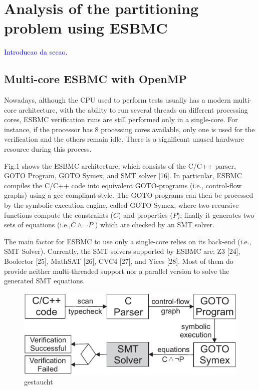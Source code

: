 \section{Analysis of the partitioning problem using ESBMC}

\textcolor{blue}{Introducao da secao.}

\subsection{Multi-core ESBMC with OpenMP}

Nowadays, although the CPU used to perform tests usually has a modern multi-core architecture, with the ability to run several threads on different processing cores, ESBMC verification runs are still performed only in a single-core. For instance, if the processor has 8 processing cores available, only one is used for the verification and the others remain idle. There is a significant unused hardware resource during this process.

Fig.1 shows the ESBMC architecture, which consists of the C/C++ parser, GOTO Program, GOTO Symex, and SMT solver [16]. In particular, ESBMC compiles the C/C++ code into equivalent GOTO\hyp{}programs (i.e., control-flow graphs) using a gcc-compliant style. The GOTO-programs can then be processed by the symbolic execution engine, called GOTO Symex, where two recursive functions compute the constraints ($ C $) and properties ($ P $); finally it generates two sets of equations (i.e.,\:$ C \land \neg P $ ) which are checked by an SMT solver. 

The main factor for ESBMC to use only a single-core relies on its back-end (i.e., SMT Solver). Currently, the SMT solvers supported by ESBMC are: Z3 [24], Boolector [25], MathSAT [26], CVC4 [27], and Yices [28]. Most of them do provide neither multi-threaded support nor a parallel version to solve the generated SMT equations.
\begin{figure}[ht]
	\centering
  \includegraphics[scale=0.9]{Image/esbmc-arch-new.pdf} 
	\caption{gestaucht}
\end{figure}


